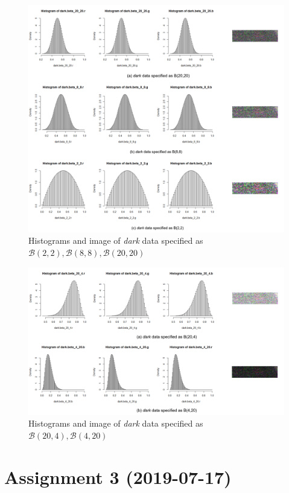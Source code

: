 \documentclass[conference,onecolumn]{IEEEtran}
\begin{document}
\begin{figure}[htbp]
	\centering
	\includegraphics[width=\linewidth]{betas_dark.png}
	\caption{Histograms and image of \textit{dark} data specified as $\mathcal{B}(2,2), \mathcal{B}(8,8), \mathcal{B}(20,20)$}
	\label{Fig:betas_dark}
\end{figure}

\begin{figure}[htbp]
	\centering
	\includegraphics[width=\linewidth]{betas2_dark.png}
	\caption{Histograms and image of \textit{dark} data specified as $\mathcal{B}(20,4), \mathcal{B}(4,20)$}
	\label{Fig:betas2_dark}
\end{figure}


\newpage
\section{Assignment 3 (2019-07-17)}
\end{document}
